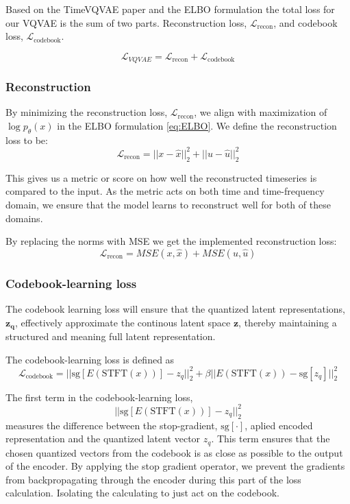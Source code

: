 Based on the TimeVQVAE\cite{lee2023masked} paper and the ELBO formulation the total loss for our VQVAE is the sum of two parts. Reconstruction loss, $\mathcal{L}_{\text{recon}}$, and codebook loss, $\mathcal{L}_\text{codebook}$.

\begin{equation}
    \mathcal{L}_{VQVAE} = \mathcal{L}_\text{recon} + \mathcal{L}_\text{codebook}
    \label{eq:VQVAEloss}
\end{equation}

\subsubsection{Reconstruction}
By minimizing the reconstruction loss, $\mathcal{L}_{\text{recon}}$, we align with maximization of $\log p_\theta(x)$ in the ELBO formulation \ref{eq:ELBO}.
We define the reconstruction loss to be:
\begin{equation}
    \mathcal{L}_{\text{recon}} = ||x-\hat{x}||_2^2 + ||u-\hat{u}||_2^2
\end{equation}

This gives us a metric or score on how well the reconstructed timeseries is compared to the input. As the metric acts on both time and time-frequency domain, we ensure that the 
model learns to reconstruct well for both of these domains.

By replacing the norms with MSE we get the implemented reconstruction loss:
\begin{equation}
    \mathcal{L}_{\text{recon}} = MSE(x,\hat{x}) + MSE(u, \hat{u})
    \label{eq:recon}
\end{equation}

\subsubsection{Codebook-learning loss}
The codebook learning loss will ensure that the quantized latent representations, $\mathbf{z_q}$, effectively approximate the continous latent space $\mathbf{z}$, thereby maintaining a structured and meaning full latent representation. 

The codebook-learning loss is defined as
\begin{equation}
    \mathcal{L}_\text{codebook} = ||\text{sg}\left[ E(\text{STFT}(x))\right] - z_q||_2^2 + \beta|| E(\text{STFT}(x)) - \text{sg}\left[ z_q \right]||_2^2
    \label{eq:codebook}
\end{equation}

The first term in the codebook-learning loss,
\begin{equation}
    ||\text{sg}\left[ E(\text{STFT}(x))\right] - z_q||_2^2
\end{equation}
measures the difference between the stop-gradient, $\text{sg}\left[\cdot\right]$, aplied encoded representation and the quantized latent vector $z_q$. This term ensures that the chosen quantized vectors from the codebook is as close as possible to the output of the encoder. By applying the stop gradient operator, we prevent the gradients from backpropagating through the encoder during this part of the loss calculation.
Isolating the calculating to just act on the codebook.

